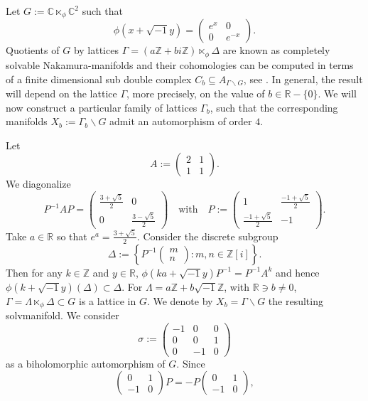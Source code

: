 \documentclass[12pt,reqno]{amsart}
\theoremstyle{definition}
\newcommand{\Z}{\mathbb{Z}}
\newcommand{\R}{\mathbb{R}}
\newcommand{\C}{\mathbb{C}}
\begin{document}
Let $G:=\C\ltimes _{\phi}\C^{2}$ such that \[
\phi(x+\sqrt{-1}y)=\left(
\begin{array}{cc}
e^{x}& 0  \\
0&    e^{-x}  
\end{array}
\right).\]
Quotients of $G$ by lattices $\Gamma=(a\Z+bi\Z)\ltimes_\phi \Delta$ are known as completely solvable Nakamura-manifolds and their cohomologies can be computed in terms of a finite dimensional sub double complex $C_b\subseteq A_{\Gamma\backslash G}$, see \cite{AK}. In general, the result will depend on the lattice $\Gamma$, more precisely, on the value of $b\in \R-\{0\}$. We will now construct a particular family of lattices $\Gamma_b$, such that the corresponding manifolds $X_b:=\Gamma_b\backslash G$ admit an automorphism of order $4$. 


Let \[
A:=\left(
\begin{array}{cc}
2& 1  \\
1&    1  
\end{array}
\right).\] 
We diagonalize
\[
P^{-1}AP=\left(
\begin{array}{cc}
 \frac{3+\sqrt{5}}{2}& 0  \\
0&    \frac{3-\sqrt{5}}{2} 
\end{array}
\right)\quad \text{with} \quad P:=\left(
\begin{array}{cc}
1& \frac{-1+\sqrt{5}}{2}  \\
\frac{-1+\sqrt{5}}{2}&    -1  
\end{array}
\right).\]
Take $a\in \R$ so that $e^{a}=\frac{3+\sqrt{5}}{2}$.
Consider the discrete  subgroup \[
\Delta:=\left\{P^{-1}\left(
\begin{array}{cc}
m  \\
n 
\end{array}\right): m,n \in \Z[i]\right\}.
\]
Then for any  $k\in \Z$ and $y\in \R$, $\phi(ka+\sqrt{-1}y)P^{-1}=P^{-1}A^{k}$
and hence $\phi(k+\sqrt{-1}y)(\Delta)\subset \Delta$.
For  $\Lambda =a\Z+b\sqrt{-1}\Z$, with $\R\ni b\not=0$, $\Gamma=\Lambda\ltimes_{\phi}\Delta\subset G$ is a lattice in $G$. We denote by $X_b=\Gamma\backslash G$ the resulting solvmanifold. We consider \[
\sigma:= \left(
\begin{array}{ccc}
-1& 0&0  \\
0&    0&1\\
0&-1&0 
\end{array}
\right)
\] as a biholomorphic automorphism of $G$.
Since 
\[\left(
\begin{array}{cc}
    0&1\\
-1&0 
\end{array}
\right)P=-P\left(
\begin{array}{cc}
    0&1\\
-1&0 
\end{array}
\right),\]
\end{document}
